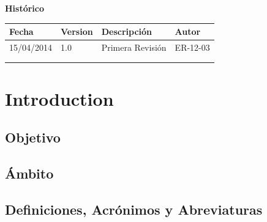 \documentclass[12pt, a4paper, titlepage]{article}
\begin{document}
\begin{titlepage}
\vspace{2cm}

\begin{center}
	\large{\textbf{Histórico}}
	
    \begin{tabular}{ | p{4cm} | p{2cm} | p{6cm} | p{3cm} |}
    \hline
    \textbf{Fecha} & \textbf{Version} & \textbf{Descripción} & \textbf{Autor} \\ \hline
      15/04/2014 & 1.0 & Primera Revisión & ER-12-03\\ \hline
      &  &  & \\ \hline
     &  & &\\ \hline
    \end{tabular}
\end{center}

\end{titlepage}
\clearpage
\tableofcontents
\newpage

\section{Introduction}


\subsection{Objetivo}


\subsection{Ámbito}


\subsection{Definiciones, Acrónimos y Abreviaturas}

\end{document}
